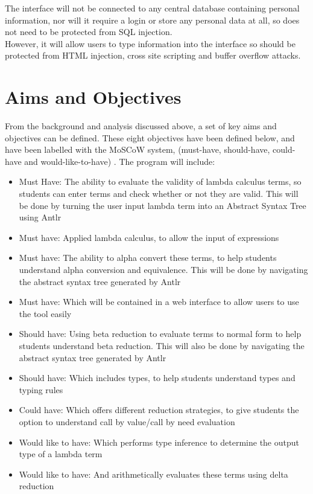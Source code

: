 \documentclass[a4paper,12pt]{report}
\begin{document}
The interface will not be connected to any central database containing personal information, nor will it require a login or store any personal data at all, so does not need to be protected from SQL injection.\\

However, it will allow users to type information into the interface so should be protected from HTML injection, cross site scripting and buffer overflow attacks.

\chapter{Aims and Objectives}

From the background and analysis discussed above, a set of key aims and objectives can be defined. These eight objectives have been defined below, and have been labelled with the MoSCoW system, (must-have, should-have, could-have and would-like-to-have) \cite{Agile2014}.
The program will include:

\begin{itemize}
	\item Must Have: The ability to evaluate the validity of lambda calculus terms, so students can enter terms and check whether or not they are valid. This will be done by turning the user input lambda term into an Abstract Syntax Tree using Antlr
	\item Must have: Applied lambda calculus, to allow the input of expressions
	\item Must have: The ability to alpha convert these terms, to help students understand alpha conversion and equivalence. This will be done by navigating the abstract syntax tree generated by Antlr
	\item Must have: Which will be contained in a web interface to allow users to use the tool easily
	\item Should have: Using beta reduction to evaluate terms to normal form to help students understand beta reduction. This will also be done by navigating the abstract syntax tree generated by Antlr
	\item Should have: Which includes types, to help students understand types and typing rules
	\item Could have: Which offers different reduction strategies, to give students the option to understand call by value/call by need evaluation
	\item Would like to have: Which performs type inference to determine the output type of a lambda term
	\item Would like to have: And arithmetically evaluates these terms using delta reduction	
\end{itemize}
\end{document}
